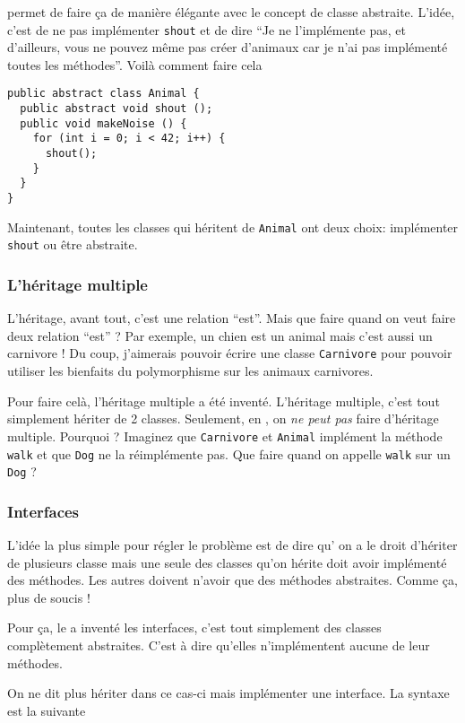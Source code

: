 \java{} permet de faire ça de manière élégante avec le concept
de classe abstraite.
L'idée, c'est de ne pas implémenter \lstinline|shout| et de dire
``Je ne l'implémente pas, et d'ailleurs, vous ne pouvez même pas créer
d'animaux car je n'ai pas implémenté toutes les méthodes''.
Voilà comment faire cela
\begin{lstlisting}
public abstract class Animal {
  public abstract void shout ();
  public void makeNoise () {
    for (int i = 0; i < 42; i++) {
      shout();
    }
  }
}
\end{lstlisting}

Maintenant, toutes les classes qui héritent de \lstinline|Animal| ont
deux choix: implémenter \lstinline|shout| ou être abstraite.

\subsubsection{L'héritage multiple}
L'héritage, avant tout, c'est une relation ``est''.
Mais que faire quand on veut faire deux relation ``est'' ?
Par exemple, un chien est un animal mais c'est aussi un carnivore !
Du coup, j'aimerais pouvoir écrire une classe \lstinline|Carnivore|
pour pouvoir utiliser les bienfaits du polymorphisme sur les animaux
carnivores.

Pour faire celà, l'héritage multiple a été inventé.
L'héritage multiple, c'est tout simplement hériter de 2 classes.
Seulement, en \java{}, on \emph{ne peut pas} faire d'héritage multiple.
Pourquoi ? Imaginez que \lstinline|Carnivore| et \lstinline|Animal|
implément la méthode \lstinline|walk| et que \lstinline|Dog| ne la
réimplémente pas. Que faire quand on appelle \lstinline|walk| sur un
\lstinline|Dog| ?

\subsubsection{Interfaces}
L'idée la plus simple pour régler le problème est de dire qu'
on a le droit d'hériter de plusieurs classe mais
une seule des classes qu'on hérite doit avoir implémenté des méthodes.
Les autres doivent n'avoir que des méthodes abstraites.
Comme ça, plus de soucis !

Pour ça, le \java{} a inventé les interfaces, c'est tout simplement
des classes complètement abstraites.
C'est à dire qu'elles n'implémentent aucune de leur méthodes.

On ne dit plus hériter dans ce cas-ci mais implémenter une interface.
La syntaxe est la suivante


